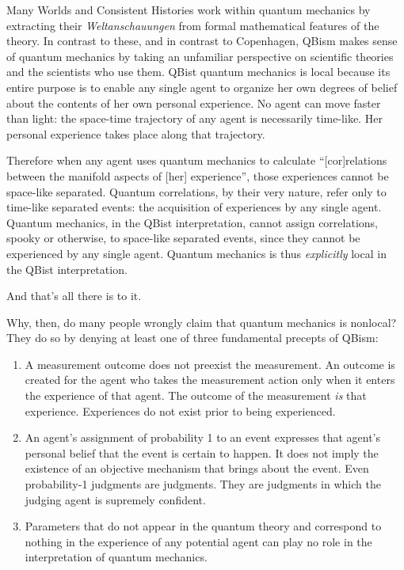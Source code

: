 \documentclass[aps,prb,superscriptaddress,12pt,tightenlines,nofootinbib]{revtex4-2}
\begin{document}
Many Worlds and Consistent Histories work within quantum mechanics by extracting their {\it Weltanschauungen\/} from  formal mathematical features of the theory.   In contrast to these, and in contrast to Copenhagen, QBism makes sense of quantum mechanics by taking an unfamiliar perspective on scientific theories and the scientists who use them.
QBist quantum mechanics is local because its entire purpose is to enable any single agent to organize her own degrees of belief about the contents of her own personal experience.      No agent can move faster than light:   the space-time trajectory of any agent is necessarily time-like.  Her personal experience takes place along that trajectory.

Therefore when any agent uses quantum mechanics to calculate  ``[cor]relations  between the manifold aspects of [her] experience'',  those experiences cannot be space-like separated.    Quantum correlations, by their very nature, refer only to time-like separated events: the acquisition  of experiences by any single agent.     Quantum mechanics, in the QBist interpretation, cannot assign correlations, spooky or otherwise, to space-like separated events, since they cannot be experienced by any single agent.    Quantum mechanics is thus {\it explicitly} local in the QBist interpretation.

And that's all there is to it.

\vskip 10pt

Why, then,  do  many people wrongly claim that quantum mechanics is nonlocal?   They  do so  by denying at least one of three fundamental precepts of QBism:

\begin{enumerate}
\item A measurement outcome does not preexist the measurement.   An outcome is created for the agent who takes the measurement action only when it enters the experience of  that agent.  The outcome of the measurement {\it is\/} that experience.    Experiences do not exist prior to being experienced.

\item An agent's assignment of probability 1 to an event  expresses that agent's personal belief that the event is certain to happen.   It does not imply the existence of an objective mechanism that brings about the event.     Even probability-1 judgments are judgments.  They are judgments in which the judging agent is supremely confident.

\item Parameters that do not appear in the quantum theory and  correspond to nothing in the experience of any potential agent can play no role in the interpretation of quantum mechanics.

\end{enumerate}
\end{document}
